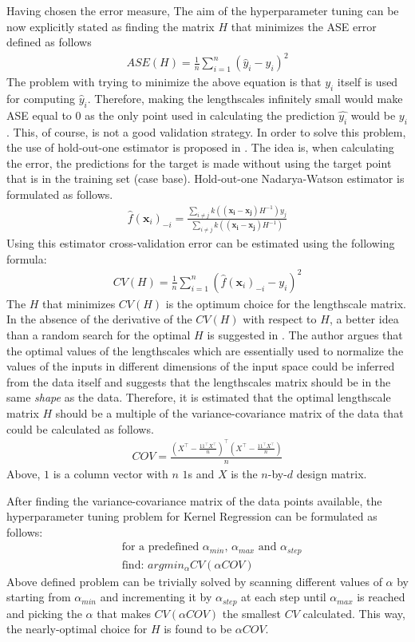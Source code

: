 Having chosen the error measure, The aim of the hyperparameter tuning can be now explicitly stated as finding the matrix $H$ that minimizes the ASE error defined as follows
\begin{align*}
ASE(H)=\frac{1}{n}\sum_{i=1}^{n}(\hat{y}_i - y_i)^2
\end{align*}
The problem with trying to minimize the above equation is that $y_i$ itself is used for computing $\hat{y}_i$. Therefore, making the lengthscales infinitely small would make ASE equal to $0$ as the only point used in calculating the prediction $\hat{y_i}$ would be $y_i$. This, of course, is not a good validation strategy. In order to solve this problem, the use of hold-out-one estimator is proposed in \citep[pp. 112-113]{hardle_nonparametric_2012}. The idea is, when calculating the error, the predictions for the target is made without using the target point that is in the training set (case base). Hold-out-one Nadarya-Watson estimator is formulated as follows.
\begin{align*}
\hat{f}(\pmb{x}_i)_{-i} = \frac{\sum_{i\neq j} k((\pmb{x_i}-\pmb{x_j})H^{-1})y_j}{\sum_{i\neq j} k((\pmb{x_i}-\pmb{x_j})H^{-1})}
\end{align*}
Using this estimator cross-validation error can be estimated using the following formula:
\begin{align*}
CV(H) = \frac{1}{n}\sum_{i=1}^{n}(\hat{f}(\pmb{x}_i)_{-i} - y_i)^2
\end{align*}
The $H$ that minimizes $CV(H)$ is the optimum choice for the lengthscale matrix. In the absence of the derivative of the $CV(H)$ with respect to $H$, a better idea than a random search for the optimal $H$ is suggested in \cite[p. 175]{silverman_density_1986}. The author argues that the optimal values of the lengthscales which are essentially used to normalize the values of the inputs in different dimensions of the input space could be inferred from the data itself and suggests that the lengthscales matrix should be in the same \textit{shape} as the data. Therefore, it is estimated that the optimal lengthscale matrix $H$ should be a multiple of the variance-covariance matrix of the data that could be calculated as follows.
\begin{align*}
COV = \frac{(X^{\top}-\frac{11^{\top}X^{\top}}{n})^{\top}(X^{\top}-\frac{11^{\top}X^{\top}}{n})}{n}
\end{align*}
Above, $1$ is a column vector with $n$ $1$s and $X$ is the $n$-by-$d$ design matrix.

After finding the variance-covariance matrix of the data points available, the hyperparameter tuning problem for Kernel Regression can be formulated as follows:
\begin{align*}
& \text{for a predefined $\alpha_{min}$, $\alpha_{max}$ and $\alpha_{step}$} \\
& \text{find: } argmin_{\alpha} CV(\alpha COV)
\end{align*}
Above defined problem can be trivially solved by scanning different values of $\alpha$ by starting from $\alpha_{min}$ and incrementing it by $\alpha_{step}$ at each step until $\alpha_{max}$ is reached and picking the $\alpha$ that makes $CV(\alpha COV)$ the smallest $CV$ calculated. This way, the nearly-optimal choice for $H$ is found to be $\alpha COV$.